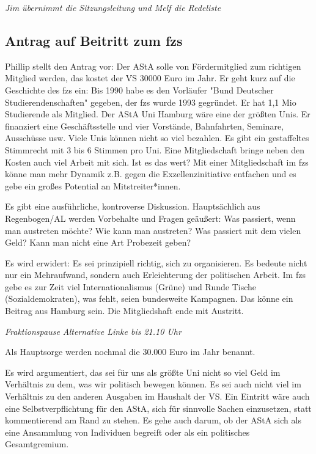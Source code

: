 \documentclass[ngerman,headheight=70pt]{scrartcl}
\begin{document}
    \textit{Jim übernimmt die Sitzungsleitung und Melf die Redeliste}

    \subsection{Antrag auf Beitritt zum fzs}

    Phillip stellt den Antrag vor: Der AStA solle von Fördermitglied zum
    richtigen Mitglied werden, das kostet der VS 30000 Euro im Jahr. Er geht
    kurz auf die Geschichte des fzs ein: Bis 1990 habe es den Vorläufer
    "Bund Deutscher Studierendenschaften" gegeben, der fzs wurde 1993 gegründet.
    Er hat 1,1 Mio Studierende als Mitglied. Der AStA Uni Hamburg wäre eine der
    größten Unis. Er finanziert eine Geschäftsstelle und vier Vorstände,
    Bahnfahrten, Seminare, Ausschüsse usw. Viele Unis können nicht so viel
    bezahlen. Es gibt ein gestaffeltes Stimmrecht mit 3 bis 6 Stimmen pro Uni.
    Eine Mitgliedschaft bringe neben den Kosten auch viel Arbeit mit sich. Ist
    es das wert? Mit einer Mitgliedschaft im fzs könne man mehr Dynamik z.B.
    gegen die Exzellenzinitiative entfachen und es gebe ein großes Potential an
    Mitstreiter*innen.

    Es gibt eine ausführliche, kontroverse Diskussion. Hauptsächlich aus
    Regenbogen/AL werden Vorbehalte und Fragen geäußert: Was passiert, wenn man
    austreten möchte? Wie kann man austreten? Was passiert mit dem vielen Geld?
    Kann man nicht eine Art Probezeit geben?

    Es wird erwidert: Es sei prinzipiell richtig, sich zu organisieren. Es bedeute
    nicht nur ein Mehraufwand, sondern auch Erleichterung der politischen Arbeit.
    Im fzs gebe es zur Zeit viel Internationalismus (Grüne) und Runde Tische
    (Sozialdemokraten), was fehlt, seien bundesweite Kampagnen. Das könne ein
    Beitrag aus Hamburg sein. Die Mitgliedshaft ende mit Austritt.

    \textit{Fraktionspause Alternative Linke bis 21.10 Uhr}

    Als Hauptsorge werden nochmal die 30.000 Euro im Jahr benannt.

    Es wird argumentiert, das sei für uns als größte Uni nicht so viel Geld im
    Verhältnis zu dem, was wir politisch bewegen können. Es sei auch nicht viel
    im Verhältnis zu den anderen Ausgaben im Haushalt der VS. Ein Eintritt wäre
    auch eine Selbstverpflichtung für den AStA, sich für sinnvolle Sachen
    einzusetzen, statt kommentierend am Rand zu stehen. Es gehe auch darum, ob
    der AStA sich als eine Ansammlung von Individuen begreift oder als ein
    politisches Gesamtgremium.
\end{document}
